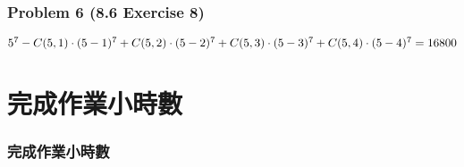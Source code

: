 \documentclass[12pt,hyperref={bookmarks=false}]{beamer}
\begin{document}
	\begin{frame}
	\frametitle{Problem 6 (8.6 Exercise 8)}
	\fontsize{10}{10pt}\selectfont
	$ 5^7 - C(5,1) \cdot (5 - 1)^7 + C(5,2) \cdot (5 - 2)^7 + C(5,3) \cdot (5 - 3)^7 + C(5,4) \cdot (5 - 4)^7 \\= 16800 $
	\end{frame}
		

		
\section{完成作業小時數}

\begin{frame}
\frametitle{完成作業小時數}
\centerline{\fontsize{16}{16pt}}	
\end{frame}

\end{document}
